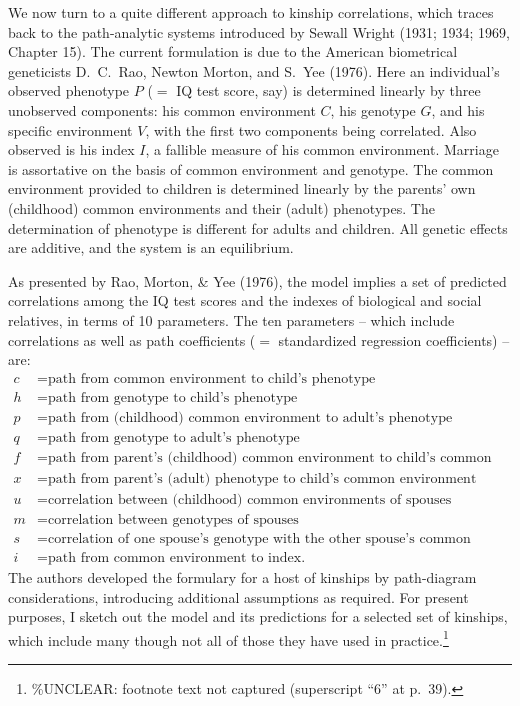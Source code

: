 ﻿\documentclass[12pt]{article}
\begin{document}
We now turn to a quite different approach to kinship correlations, which traces back to the path-analytic systems introduced by Sewall Wright (1931; 1934; 1969, Chapter 15). The current formulation is due to the American biometrical geneticists D.\ C.\ Rao, Newton Morton, and S.\ Yee (1976). Here an individual's observed phenotype $P$ ($=$ IQ test score, say) is determined linearly by three unobserved components: his common environment $C$, his genotype $G$, and his specific environment $V$, with the first two components being correlated. Also observed is his index $I$, a fallible measure of his common environment. Marriage is assortative on the basis of common environment and genotype. The common environment provided to children is determined linearly by the parents' own (childhood) common environments and their (adult) phenotypes. The determination of phenotype is different for adults and children. All genetic effects are additive, and the system is an equilibrium.

As presented by Rao, Morton, \& Yee (1976), the model implies a set of predicted correlations among the IQ test scores and the indexes of biological and social relatives, in terms of 10 parameters. The ten parameters -- which include correlations as well as path coefficients ($=$ standardized regression coefficients) -- are:
\begin{align*}
c &= \text{path from common environment to child's phenotype} \\
h &= \text{path from genotype to child's phenotype} \\
p &= \text{path from (childhood) common environment to adult's phenotype} \\
q &= \text{path from genotype to adult's phenotype} \\
f &= \text{path from parent's (childhood) common environment to child's common environment} \\
x &= \text{path from parent's (adult) phenotype to child's common environment} \\
u &= \text{correlation between (childhood) common environments of spouses} \\
m &= \text{correlation between genotypes of spouses} \\
s &= \text{correlation of one spouse's genotype with the other spouse's common environment} \\
i &= \text{path from common environment to index.}
\end{align*}
The authors developed the formulary for a host of kinships by path-diagram considerations, introducing additional assumptions as required. For present purposes, I sketch out the model and its predictions for a selected set of kinships, which include many though not all of those they have used in practice.\footnote{\%UNCLEAR: footnote text not captured (superscript ``6'' at p.\ 39).}
\end{document}

